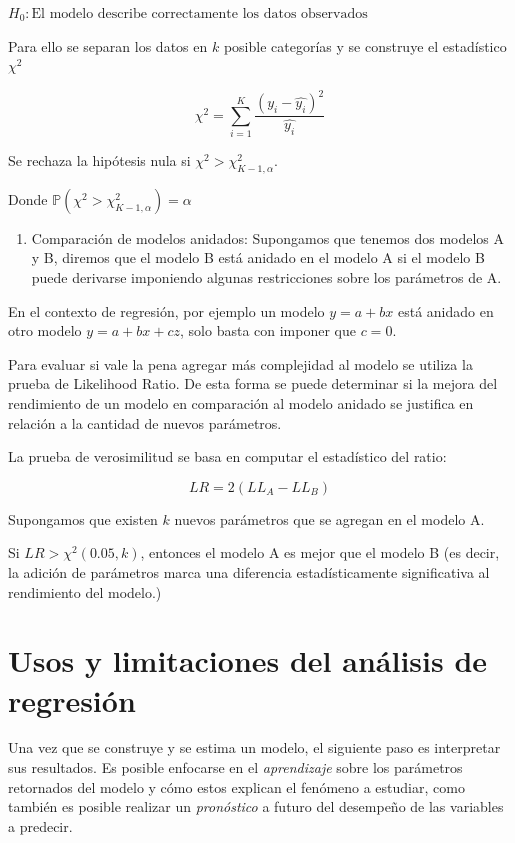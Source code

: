 \documentclass[
]{book}
\providecommand{\tightlist}{%
  \setlength{\itemsep}{0pt}\setlength{\parskip}{0pt}}
\begin{document}
\(H_0: \text{El modelo describe correctamente los datos observados}\)

Para ello se separan los datos en \(k\) posible categorías y se construye
el estadístico \(\chi^2\)

\[\chi^2 = \sum_{i = 1}^{K} \frac{(y_i - \hat{y_i})^2}{\hat{y_i}}\]

Se rechaza la hipótesis nula si \(\chi^2 > \chi^{2}_{K-1, α}\).

Donde \(\mathbb{P}(\chi^2 > \chi^{2}_{K-1, α}) = α\)

\begin{enumerate}
\def\labelenumi{\arabic{enumi}.}
\setcounter{enumi}{1}
\tightlist
\item
  Comparación de modelos anidados: Supongamos que tenemos dos modelos
  A y B, diremos que el modelo B está anidado en el modelo A si el
  modelo B puede derivarse imponiendo algunas restricciones sobre los
  parámetros de A.
\end{enumerate}

En el contexto de regresión, por ejemplo un modelo \(y=a+bx\) está anidado
en otro modelo \(y=a+bx+cz\), solo basta con imponer que \(c=0\).

Para evaluar si vale la pena agregar más complejidad al modelo se
utiliza la prueba de Likelihood Ratio. De esta forma se puede determinar
si la mejora del rendimiento de un modelo en comparación al modelo
anidado se justifica en relación a la cantidad de nuevos parámetros.

La prueba de verosimilitud se basa en computar el estadístico del ratio:

\[LR = 2(LL_A - LL_B)\]

Supongamos que existen \(k\) nuevos parámetros que se agregan en el modelo
A.

Si \(LR > \chi^2(0.05, k)\), entonces el modelo A es mejor que el modelo B
(es decir, la adición de parámetros marca una diferencia
estadísticamente significativa al rendimiento del modelo.)

\section{Usos y limitaciones del análisis de regresión}\label{usos-y-limitaciones-del-anuxe1lisis-de-regresiuxf3n}

Una vez que se construye y se estima un modelo, el siguiente paso es
interpretar sus resultados. Es posible enfocarse en el \emph{aprendizaje}
sobre los parámetros retornados del modelo y cómo estos explican el
fenómeno a estudiar, como también es posible realizar un \emph{pronóstico} a
futuro del desempeño de las variables a predecir.
\end{document}
